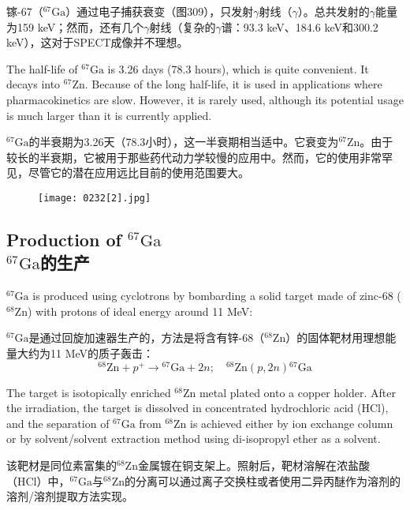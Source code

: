 \documentclass[dvipsnames, svgnames,a4paper,11pt]{article}
\begin{document}
镓-67（\(\mathrm{^{67}Ga}\)）通过电子捕获衰变（图309），只发射$\gamma$射线（\(\gamma\)）。总共发射的$\gamma$能量为159 keV；然而，还有几个$\gamma$射线（复杂的$\gamma$谱：93.3 keV、184.6 keV和300.2 keV），这对于SPECT成像并不理想。

The half-life of \(\mathrm{^{67}Ga}\) is 3.26 days (78.3 hours), which is quite convenient. It decays into \(\mathrm{^{67}Zn}\). Because of the long half-life, it is used in applications where pharmacokinetics are slow. However, it is rarely used, although its potential usage is much larger than it is currently applied.

\(\mathrm{^{67}Ga}\)的半衰期为3.26天（78.3小时），这一半衰期相当适中。它衰变为\(\mathrm{^{67}Zn}\)。由于较长的半衰期，它被用于那些药代动力学较慢的应用中。然而，它的使用非常罕见，尽管它的潜在应用远比目前的使用范围要大。

\begin{figure}[h]
	\centering
    \texttt{[image: 0232[2].jpg]}  
     \label{fig309}
\end{figure}

\subsection{Production of \(\mathrm{^{67}Ga}\)\\ \(\mathrm{^{67}Ga}\)的生产}  
\(\mathrm{^{67}Ga}\) is produced using cyclotrons by bombarding a solid target made of zinc-68 (\(\mathrm{^{68}Zn}\)) with protons of ideal energy around 11 MeV:

\(\mathrm{^{67}Ga}\)是通过回旋加速器生产的，方法是将含有锌-68（\(\mathrm{^{68}Zn}\)）的固体靶材用理想能量大约为11 MeV的质子轰击：
\[
\mathrm{^{68}Zn} + p^{+} \rightarrow \mathrm{^{67}Ga} + 2n; \quad \mathrm{^{68}Zn}(p, 2n)\mathrm{^{67}Ga}
\]

The target is isotopically enriched \(\mathrm{^{68}Zn}\) metal plated onto a copper holder. After the irradiation, the target is dissolved in concentrated hydrochloric acid (HCl), and the separation of \(\mathrm{^{67}Ga}\) from \(\mathrm{^{68}Zn}\) is achieved either by ion exchange column or by solvent/solvent extraction method using di-isopropyl ether as a solvent.

该靶材是同位素富集的\(\mathrm{^{68}Zn}\)金属镀在铜支架上。照射后，靶材溶解在浓盐酸（HCl）中，\(\mathrm{^{67}Ga}\)与\(\mathrm{^{68}Zn}\)的分离可以通过离子交换柱或者使用二异丙醚作为溶剂的溶剂/溶剂提取方法实现。
\end{document}
